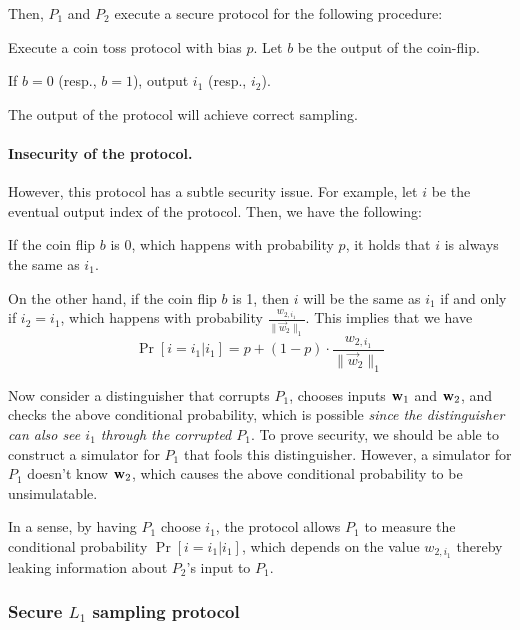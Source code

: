 \item Then, $P_1$ and $P_2$ execute a secure protocol for the following
procedure:
  \BEN
  \item Execute a coin toss protocol with bias $p$.  Let $b$ be the output of the coin-flip. 
  \item If $b=0$ (resp., $b=1$), output $i_1$ (resp., $i_2$).
  \EEN
\EEN

The output of the protocol will achieve correct sampling.  

\paragraph{Insecurity of the protocol.} However, this protocol has a
subtle security issue.
%
For example, let $i$ be the eventual output index of the protocol. Then,
we have the following:
%
\BI
\item If the coin flip $b$ is 0, which happens with probability $p$, it
holds that $i$ is always the same as $i_1$. 

\item On the other hand, if the coin flip $b$ is 1, then $i$ will be
the same as $i_1$ if and only if $i_2 = i_1$, which happens with
probability $\frac{w_{2, i_1}}{ \| \vec w_2 \|_1 }$.
\EI
%
This implies that we have 
$$\Pr[ i = i_1 | i_1 ] = p + (1-p) \cdot \frac{w_{2, i_1}}{ \| \vec w_2 \|_1 }$$

Now consider a distinguisher that corrupts $P_1$, chooses inputs $\mathbf{w}_1$
and $\mathbf{w}_2$, and checks the above conditional probability, which is
possible {\em since the distinguisher can also see $i_1$ through the corrupted
$P_1$}.
%
To prove security, we should be able to construct a simulator for $P_1$
that fools this distinguisher. However, a simulator for $P_1$ doesn't know
$\mathbf{w}_2$, which causes the above conditional probability to be
unsimulatable. 
%

In a sense, by having $P_1$ choose $i_1$, the protocol allows $P_1$ to
measure the conditional probability $\Pr[ i = i_1 | i_1 ]$, which
depends on the value $w_{2, i_1}$ thereby leaking information about
$P_2$'s input to $P_1$.   


\subsubsection{Secure $L_1$ sampling protocol}  \label{sec:L1prot}
